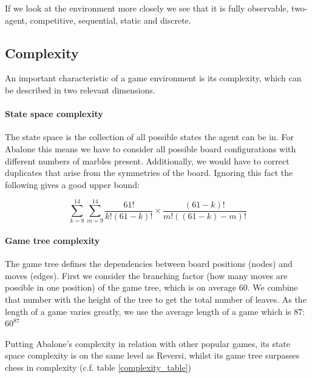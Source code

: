 \documentclass{llncs}
\begin{document}
If we look at the environment more closely we see that it is fully observable, two-agent, competitive, sequential, static and discrete.

\subsection{Complexity}
An important characteristic of a game environment is its complexity, which can be described in two relevant dimensions.

\paragraph{State space complexity}

The state space is the collection of all possible states the agent can be in.\cite[p. 150]{russell_artificial_2021} For Abalone this means we have to consider all possible board configurations with different numbers of marbles present. Additionally, we would have to correct duplicates that arise from the symmetries of the board. Ignoring this fact the following gives a good upper bound:

$$
  \sum_{k=8}^{14}\sum_{m=9}^{14}\frac{61!}{k!(61-k)!}\times\frac{(61-k)!}{m!((61-k)-m)!}
$$

\paragraph{Game tree complexity} The game tree defines the dependencies between board positions (nodes) and moves (edges). First we consider the branching factor (how many moves are possible in one position) of the game tree, which is on average 60. We combine that number with the height of the tree to get the total number of leaves. As the length of a game varies greatly, we use the average length of a game which is 87: $60^{87}$ \cite{lemmens_constructing_2005}

Putting Abalone's complexity in relation with other popular games, its state space complexity is on the same level as Reversi, whilst its game tree surpasses chess in complexity (c.f. table \ref{complexity_table})
\end{document}
